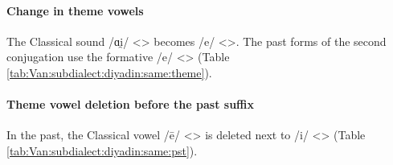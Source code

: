 \paragraph{Change in theme vowels} 

The Classical sound /ɑi̯/ <> becomes /e/ <>. The past forms of the second conjugation use the formative /e/ <> (Table \ref{tab:Van:subdialect:diyadin:same:theme}). 

\begin{table}[H]
	\centering
	\caption{Changes in theme vowels in the Diyadin subdialect of the Van dialect}
	\label{tab:Van:subdialect:diyadin:same:theme}
\end{table} 

\paragraph{Theme vowel deletion before the past suffix} 

In the past, the Classical vowel /ē/ <> is deleted next to /i/ <> (Table \ref{tab:Van:subdialect:diyadin:same:pst}). 


